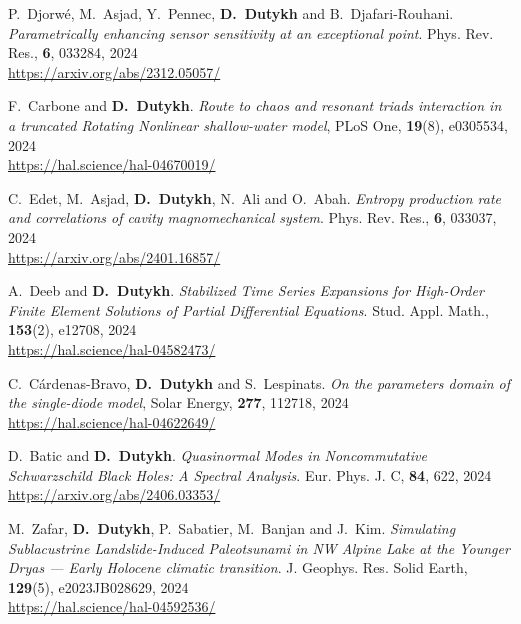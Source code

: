 \begin{etaremune}
  \item P.~Djorw\'e, M.~Asjad, Y.~Pennec, \textbf{D.~Dutykh} and B.~Djafari-Rouhani. \textit{Parametrically enhancing sensor sensitivity at an exceptional point}. Phys. Rev. Res., \textbf{6}, 033284, 2024 \\ %
  \url{https://arxiv.org/abs/2312.05057/}
  
  \item F.~Carbone and \textbf{D.~Dutykh}. \textit{Route to chaos and resonant triads interaction in a truncated Rotating Nonlinear shallow-water model}, PLoS One, \textbf{19}(8), e0305534, 2024 \\ %
  \url{https://hal.science/hal-04670019/}

  \item C.~Edet, M.~Asjad, \textbf{D.~Dutykh}, N.~Ali and O.~Abah. \textit{Entropy production rate and correlations of cavity magnomechanical system}. Phys. Rev. Res., \textbf{6}, 033037, 2024 \\ %
  \url{https://arxiv.org/abs/2401.16857/}

  \item A.~Deeb and \textbf{D.~Dutykh}. \textit{Stabilized Time Series Expansions for High-Order Finite Element Solutions of Partial Differential Equations}. Stud. Appl. Math., \textbf{153}(2), e12708, 2024 \\ %
  \url{https://hal.science/hal-04582473/}
  
  \item C.~C\'ardenas-Bravo, \textbf{D.~Dutykh} and S.~Lespinats. \textit{On the parameters domain of the single-diode model}, Solar Energy, \textbf{277}, 112718, 2024 \\ %
  \url{https://hal.science/hal-04622649/}
  
  \item D.~Batic and \textbf{D.~Dutykh}. \textit{Quasinormal Modes in Noncommutative Schwarzschild Black Holes: A Spectral Analysis}. Eur. Phys. J. C, \textbf{84}, 622, 2024 \\ %
  \url{https://arxiv.org/abs/2406.03353/}

  \item M.~Zafar, \textbf{D.~Dutykh}, P.~Sabatier, M.~Banjan and J.~Kim. \textit{Simulating Sublacustrine Landslide-Induced Paleotsunami in NW Alpine Lake at the Younger Dryas --- Early Holocene climatic transition}. J. Geophys. Res. Solid Earth, \textbf{129}(5), e2023JB028629, 2024 \\ %
  \url{https://hal.science/hal-04592536/}
  

\end{etaremune}
